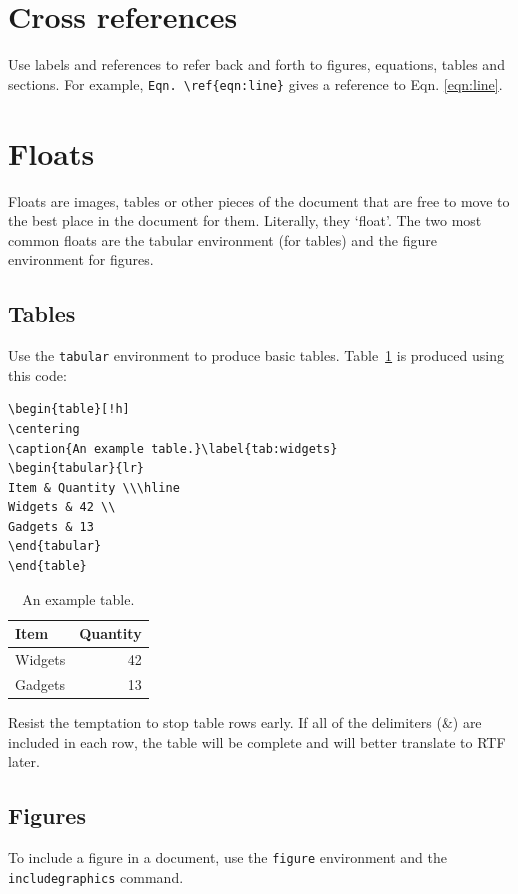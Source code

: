 \section{Cross references}
Use labels and references to refer back and forth to figures, equations, tables and sections. For example, \verb+Eqn. \ref{eqn:line}+ gives a reference to Eqn. \ref{eqn:line}.

\section{Floats}
Floats are images, tables or other pieces of the document that are free to move to the best place in the document for them. Literally, they `float'. The two most common floats are the tabular environment (for tables) and the figure environment for figures.

\subsection{Tables}
Use the \texttt{tabular} environment to produce basic tables. Table~\ref{tab:widgets} is produced using this code: 

\begin{verbatim}
\begin{table}[!h]
\centering
\caption{An example table.}\label{tab:widgets}
\begin{tabular}{lr}
Item & Quantity \\\hline
Widgets & 42 \\
Gadgets & 13
\end{tabular}
\end{table}
\end{verbatim}

\begin{table}[!h]
\centering
\caption{An example table.}\label{tab:widgets}
\begin{tabular}{lr}
Item & Quantity \\\hline
Widgets & 42 \\
Gadgets & 13
\end{tabular}
\end{table}

Resist the temptation to stop table rows early. If all of the delimiters  (\&) are included in each row, the table will be complete and will better translate to RTF later.

\subsection{Figures}
To include a figure in a document, use the \texttt{figure} environment and the \texttt{includegraphics} command.

